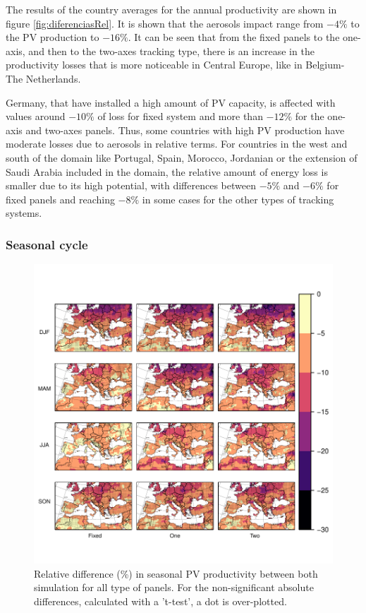 The results of the country averages for the annual productivity are shown in figure \ref{fig:diferenciasRel}. It is shown that the aerosols impact range from $-4\%$ to the PV production to $-16\%$. It can be seen that from the fixed panels to the one-axis, and then to the two-axes tracking type, there is an increase in the productivity losses that is more noticeable in Central Europe, like in Belgium-The Netherlands.

Germany, that have installed a high amount of PV capacity, is affected with values around $-10\%$ of loss for fixed system and more than $-12\%$ for the one-axis and two-axes panels. Thus, some countries with high PV production have moderate losses due to aerosols in relative terms. For countries in the west and south of the domain like Portugal, Spain, Morocco, Jordanian or the extension of Saudi Arabia included in the domain, the relative amount of energy loss is smaller due to its high potential, with differences between $-5\%$ and $-6\%$ for fixed panels and reaching $-8\%$ in some cases for the other types of tracking systems.

\subsubsection{Seasonal cycle}

\begin{figure}[h!]
  \centering
  \includegraphics[width=1\textwidth]{figs/capitulo6/RelDif_aer_no_all20032009SIGt.pdf}
\caption{Relative difference (\%) in seasonal PV productivity between both simulation for all type of panels. For the non-significant absolute differences, calculated with a 't-test', a dot is over-plotted.}
\label{mapas}
\end{figure}

